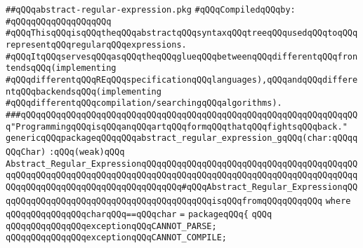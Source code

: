 \label{src/lib/regex/front/abstract-regular-expression.pkg}
\verb|##qQQqabstract-regular-expression.pkg|\newline
\newline
\verb|#qQQqCompiledqQQqby:|\newline
\verb|#qQQqqQQqqQQqqQQqqQQq|\newline
\newline
\verb|#qQQqThisqQQqisqQQqtheqQQqabstractqQQqsyntaxqQQqtreeqQQqusedqQQqtoqQQqrepresentqQQqregularqQQqexpressions.|\newline
\verb|#qQQqItqQQqservesqQQqasqQQqtheqQQqglueqQQqbetweenqQQqdifferentqQQqfrontendsqQQq(implementing|\newline
\verb|#qQQqdifferentqQQqREqQQqspecificationqQQqlanguages),qQQqandqQQqdifferentqQQqbackendsqQQq(implementing|\newline
\verb|#qQQqdifferentqQQqcompilation/searchingqQQqalgorithms).|\newline
\newline
\newline
\newline
\verb|###qQQqqQQqqQQqqQQqqQQqqQQqqQQqqQQqqQQqqQQqqQQqqQQqqQQqqQQqqQQqqQQqqQQq"ProgrammingqQQqisqQQqanqQQqartqQQqformqQQqthatqQQqfightsqQQqback."|\newline
\newline
\newline
\verb|genericqQQqpackageqQQqqQQqabstract_regular_expression_gqQQq(char:qQQqqQQqChar)|\newline
\verb|:qQQq(weak)qQQq|\newline
\verb|Abstract_Regular_ExpressionqQQqqQQqqQQqqQQqqQQqqQQqqQQqqQQqqQQqqQQqqQQqqQQqqQQqqQQqqQQqqQQqqQQqqQQqqQQqqQQqqQQqqQQqqQQqqQQqqQQqqQQqqQQqqQQqqQQqqQQqqQQqqQQqqQQqqQQqqQQqqQQqqQQq#qQQqAbstract_Regular_ExpressionqQQqqQQqqQQqqQQqqQQqqQQqqQQqqQQqqQQqqQQqqQQqisqQQqfromqQQqqQQqqQQq|\newline
\verb|where|\newline
\verb|qQQqqQQqqQQqqQQqcharqQQq==qQQqchar|\newline
\verb|=|\newline
\verb|packageqQQq{|\newline
\verb|qQQq|\newline
\verb|qQQqqQQqqQQqqQQqexceptionqQQqCANNOT_PARSE;|\newline
\verb|qQQqqQQqqQQqqQQqexceptionqQQqCANNOT_COMPILE;|\newline
